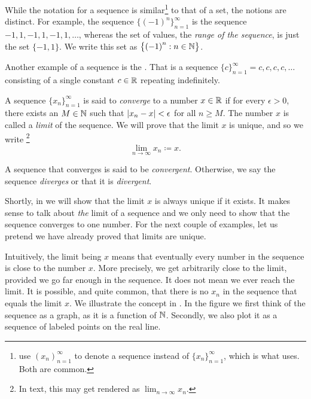 While the notation for a sequence
is similar\footnote{\cite{BS} use $(x_n)_{n=1}^\infty$ to denote
a sequence instead of $\{ x_n \}_{n=1}^\infty$, which is what \cite{Rudin:baby} uses.
Both are common.}
to that of a set, the notions are
distinct.  For example, the sequence $\bigl\{ {(-1)}^n \bigr\}_{n=1}^\infty$ is the sequence
$-1,1,-1,1,-1,1,\ldots$, whereas the set of values, the
\emph{range of the sequence},
is just the set $\{ -1, 1 \}$.  We write this set
as $\bigl\{ {(-1)}^n : n \in {\mathbb{N}} \bigr\}$.

Another example of a sequence is the \emph{}.
That is a sequence $\{ c \}_{n=1}^\infty = c,c,c,c,\ldots$ consisting of a single
constant $c \in {\mathbb{R}}$ repeating indefinitely.


\begin{defn}
A sequence $\{ x_n \}_{n=1}^\infty$ is said to \emph{converge} to a number
$x \in {\mathbb{R}}$ if for every $\epsilon > 0$, there exists an $M \in {\mathbb{N}}$ such
that $\lvert {x_n - x} \rvert < \epsilon$ for all $n \geq M$.
The number $x$ is called a \emph{limit} of the sequence.
We will prove that the limit $x$ is unique, and so we write%
\footnote{In text, this may get rendered as $\lim_{n\to\infty} x_n$.}
%
\begin{equation*}
\lim_{n\to \infty} x_n \coloneqq x .
\end{equation*}

A sequence
that converges is said to be \emph{convergent}.
Otherwise, we say the sequence \emph{diverges}
or that it is
\emph{divergent}.
\end{defn}

Shortly, in  we will show that the limit $x$ is always
unique if it exists.  It makes sense to talk about \emph{the} limit of
a sequence and we only need to show that the sequence converges to one
number.
For the next couple of examples, let us pretend
we have already proved that limits are unique.

Intuitively, the limit being $x$ means that eventually
every number in the sequence is close to the number $x$.  More precisely,
we get arbitrarily close to the limit, provided we go far enough in the
sequence.  It does not mean we ever reach the limit.  It is possible,
and quite common, that there is no $x_n$ in the sequence that equals the
limit $x$.
We illustrate the concept in .  In the
figure we first think of the sequence as a graph, as it is a function of
${\mathbb{N}}$.   Secondly, we also plot it as a sequence of labeled points on the real
line.

